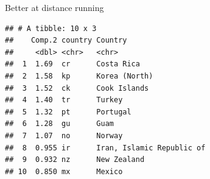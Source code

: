 \documentclass[
  ignorenonframetext,
]{beamer}
\newenvironment{Shaded}{\begin{snugshade}}{\end{snugshade}}
\newcommand{\DataTypeTok}[1]{\textcolor[rgb]{0.13,0.29,0.53}{#1}}
\newcommand{\DecValTok}[1]{\textcolor[rgb]{0.00,0.00,0.81}{#1}}
\newcommand{\FloatTok}[1]{\textcolor[rgb]{0.00,0.00,0.81}{#1}}
\newcommand{\KeywordTok}[1]{\textcolor[rgb]{0.13,0.29,0.53}{\textbf{#1}}}
\newcommand{\NormalTok}[1]{#1}
\newcommand{\OperatorTok}[1]{\textcolor[rgb]{0.81,0.36,0.00}{\textbf{#1}}}
\newcommand{\StringTok}[1]{\textcolor[rgb]{0.31,0.60,0.02}{#1}}
\begin{document}
\begin{frame}[fragile]{Better at distance running}
\protect\hypertarget{better-at-distance-running}{}

\footnotesize

\begin{Shaded}
\end{Shaded}

\begin{verbatim}
## # A tibble: 10 x 3
##    Comp.2 country Country                  
##     <dbl> <chr>   <chr>                    
##  1  1.69  cr      Costa Rica               
##  2  1.58  kp      Korea (North)            
##  3  1.52  ck      Cook Islands             
##  4  1.40  tr      Turkey                   
##  5  1.32  pt      Portugal                 
##  6  1.28  gu      Guam                     
##  7  1.07  no      Norway                   
##  8  0.955 ir      Iran, Islamic Republic of
##  9  0.932 nz      New Zealand              
## 10  0.850 mx      Mexico
\end{verbatim}

\normalsize

\end{frame}
\end{document}
